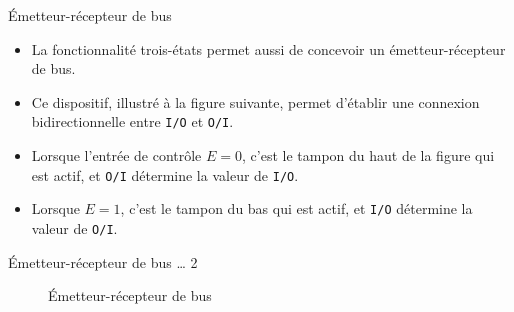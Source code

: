 \documentclass[presentation]{beamer}
\begin{document}
\begin{frame}[label={sec:org2499630},fragile]{Émetteur-récepteur de bus}
 \begin{itemize}
\item La fonctionnalité trois-états permet aussi de concevoir un émetteur-récepteur de bus.

\item Ce dispositif, illustré à la figure suivante, permet d'établir une connexion bidirectionnelle entre \texttt{I/O} et \texttt{O/I}.

\item Lorsque l'entrée de contrôle \(E = 0\), c'est le tampon du haut de la figure qui est actif, et \texttt{O/I} détermine la valeur de \texttt{I/O}.

\item Lorsque \(E = 1\), c'est le tampon du bas qui est actif, et \texttt{I/O} détermine la valeur de \texttt{O/I}.
\end{itemize}
\end{frame}

\begin{frame}[label={sec:orgbf5f66a}]{Émetteur-récepteur de bus \ldots{} 2}
\begin{figure}[htbp]
\centering

\caption{\label{fig:org0491670}Émetteur-récepteur de bus}
\end{figure}
\end{frame}
\end{document}
